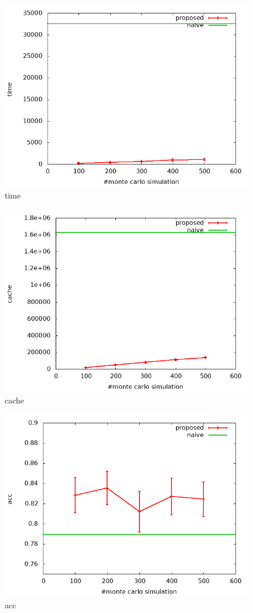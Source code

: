 \documentclass[a4paper,10.5pt]{article}           %
\begin{document}
\begin{figure}[htbp]
		\begin{center}
			\includegraphics[width=110mm]{../time.png}
		\end{center}
		\caption{time}
\end{figure}

\begin{figure}[htbp]
		\begin{center}
			\includegraphics[width=110mm]{../cache.png}
		\end{center}
		\caption{cache}
\end{figure}
\begin{figure}[htbp]
		\begin{center}
			\includegraphics[width=110mm]{../acc.png}
		\end{center}
		\caption{acc}
\end{figure}
\end{document}
